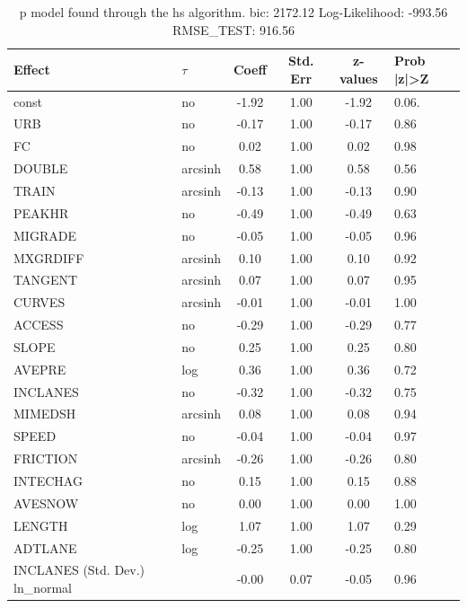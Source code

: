 \begin{table}
	\caption{p model found through the hs algorithm. bic: 2172.12 Log-Likelihood: -993.56 RMSE_TEST: 916.56}
	\begin{center}
		\begin{tabular}{|l|l|c|c|c|l|}
			\hline
			Effect & $\tau$ & Coeff & Std. Err & z-values & Prob |z|>Z \\
			\hline
			const & no & -1.92 & 1.00 & -1.92 & 0.06. \\
			\hline
			URB & no & -0.17 & 1.00 & -0.17 & 0.86 \\
			\hline
			FC & no & 0.02 & 1.00 & 0.02 & 0.98 \\
			\hline
			DOUBLE & arcsinh & 0.58 & 1.00 & 0.58 & 0.56 \\
			\hline
			TRAIN & arcsinh & -0.13 & 1.00 & -0.13 & 0.90 \\
			\hline
			PEAKHR & no & -0.49 & 1.00 & -0.49 & 0.63 \\
			\hline
			MIGRADE & no & -0.05 & 1.00 & -0.05 & 0.96 \\
			\hline
			MXGRDIFF & arcsinh & 0.10 & 1.00 & 0.10 & 0.92 \\
			\hline
			TANGENT & arcsinh & 0.07 & 1.00 & 0.07 & 0.95 \\
			\hline
			CURVES & arcsinh & -0.01 & 1.00 & -0.01 & 1.00 \\
			\hline
			ACCESS & no & -0.29 & 1.00 & -0.29 & 0.77 \\
			\hline
			SLOPE & no & 0.25 & 1.00 & 0.25 & 0.80 \\
			\hline
			AVEPRE & log & 0.36 & 1.00 & 0.36 & 0.72 \\
			\hline
			INCLANES & no & -0.32 & 1.00 & -0.32 & 0.75 \\
			\hline
			MIMEDSH & arcsinh & 0.08 & 1.00 & 0.08 & 0.94 \\
			\hline
			SPEED & no & -0.04 & 1.00 & -0.04 & 0.97 \\
			\hline
			FRICTION & arcsinh & -0.26 & 1.00 & -0.26 & 0.80 \\
			\hline
			INTECHAG & no & 0.15 & 1.00 & 0.15 & 0.88 \\
			\hline
			AVESNOW & no & 0.00 & 1.00 & 0.00 & 1.00 \\
			\hline
			LENGTH & log & 1.07 & 1.00 & 1.07 & 0.29 \\
			\hline
			ADTLANE & log & -0.25 & 1.00 & -0.25 & 0.80 \\
			\hline
			INCLANES (Std. Dev.) ln_normal &  & -0.00 & 0.07 & -0.05 & 0.96 \\

\end{tabular}
\end{center}
\end{table}
